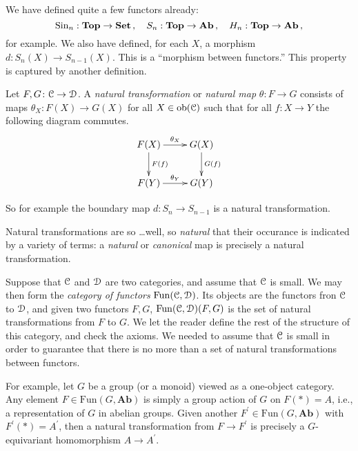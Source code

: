 We have defined quite a few functors already:
\[
\mathrm{Sin}_n:\mathbf{Top}\to\mathbf{Set}\,,\quad S_n:\mathbf{Top}\to\mathbf{Ab}\,,\quad H_n:\mathbf{Top}\to\mathbf{Ab}\,,
\]
for example. We also have defined, for each $X$, 
a morphism $d:S_n(X)\to S_{n-1}(X)$. This is a ``morphism between 
functors.'' This property is captured by another definition.
\begin{definition}
Let $F,G\colon \mathcal C\to\mathcal D$. A \emph{natural transformation} 
or \emph{natural map} $\theta\colon F\to G$ consists of maps $\theta_X\colon F(X)\to G(X)$ for all $X\in\mathrm{ob}(\mathcal C)$ such that for all $f\colon X\to Y$ the following diagram commutes. 
\begin{equation*}
\xymatrix{F(X)\ar[d]^{F(f)}\ar[r]^{\theta_X} & G(X)\ar[d]^{G(f)}\\
F(Y)\ar[r]^{\theta_Y} & G(Y)}
\end{equation*}
\end{definition}
So for example 
the boundary map $d\colon S_n\to S_{n-1}$ is a natural transformation.

Natural transformations are so \ldots well, so {\em natural} that their
occurance is indicated by a variety of terms: a {\em natural} or 
{\em canonical} map is precisely a natural transformation. 

\begin{example}
Suppose that $\mathcal C$ and $\mathcal D$ are two categories, and assume that $\mathcal C$ is
small. We may then form the {\em category of functors} $\mathrm{Fun}(\mathcal C,\mathcal D)$.
Its objects are the functors fron $\mathcal C$ to $\mathcal D$, and given two functors
$F,G$, $\operatorname{Fun}(\mathcal C,\mathcal D)(F,G)$ is the set of natural transformations from $F$
to $G$. We let the reader define the rest of the structure of this category,
and check the axioms. We needed to assume that $\mathcal C$ is small in order to
guarantee that there is no more than a set of natural transformations between
functors.

For example, let $G$ be a group (or a monoid) viewed as a one-object category. Any element $F\in\mathrm{Fun}(G,\mathbf{Ab})$ is simply a group action of $G$ on $F(\ast)=A$, i.e., a representation of $G$ in abelian groups. Given another $F^\prime\in\mathrm{Fun}(G,\mathbf{Ab})$ with $F^\prime(\ast)=A^\prime$, then a natural transformation from $F\to F^\prime$ is precisely a $G$-equivariant homomorphism $A\to A^\prime$.
\end{example}

